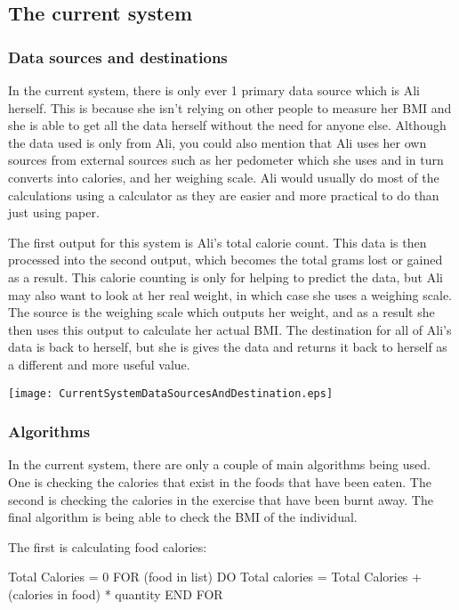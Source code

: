 \subsection{The current system}

\subsubsection{Data sources and destinations}
In the current system, there is only ever 1 primary data source which is Ali herself. This is because she isn't relying on other people to measure her BMI and she is able to get all the data herself without the need for anyone else. Although the data used is only from Ali, you could also mention that Ali uses her own sources from external sources such as her pedometer which she uses and in turn converts into calories, and her weighing scale. Ali would usually do most of the calculations using a calculator as they are easier and more practical to do than just using paper.

The first output for this system is Ali's total calorie count. This data is then processed into the second output, which becomes the total grams lost or gained as a result. This calorie counting is only for helping to predict the data, but Ali may also want to look at her real weight, in which case she uses a weighing scale. The source is the weighing scale which outputs her weight, and as a result she then uses this output to calculate her actual BMI. The destination for all of Ali's data is back to herself, but she is gives the data and returns it back to herself as a different and more useful value.


\texttt{[image: CurrentSystemDataSourcesAndDestination.eps]}

\subsubsection{Algorithms}
In the current system, there are only a couple of main algorithms being used. One is checking the calories that exist in the foods that have been eaten. The second is checking the calories in the exercise that have been burnt away. The final algorithm is being able to check the BMI of the individual.

The first is calculating food calories:

Total Calories = 0
FOR (food in list) DO
	Total calories = Total Calories + (calories in food) * quantity
END FOR

